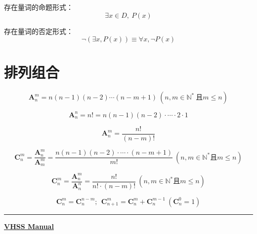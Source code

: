 \documentclass[a5paper]{article}
\begin{document}

存在量词的命题形式：
\begin{equation*}
    \exists{}x \in D,~P(x)
\end{equation*}

存在量词的否定形式：
\begin{equation*}
    \neg(\exists x,P(x)) \equiv \forall{}x, \neg P(x)
\end{equation*}


\section{{\large \textbf{排列组合}}}

\begin{equation*}
    \textbf{A}_{n}^{m} = n(n-1)(n-2)\cdots{}(n-m+1)~(n, m \in \mathbb{N}^{*}~\text{且}m \le n)
\end{equation*}

\begin{equation*}
    \textbf{A}_{n}^{n} = n! = n(n-1)(n-2) \cdot \cdots{} \cdot 2 \cdot 1
\end{equation*}

\begin{equation*}
    \textbf{A}_n^{m} = \frac{n!}{(n-m)!}
\end{equation*}

\begin{equation*}
    \textbf{C}_{n}^m = \frac{\textbf{A}_n^{m}}{\textbf{A}_m^{m}} = \frac{n(n-1)(n-2) \cdot \cdots{} \cdot (n-m+1)}{m!}~(n,m \in \mathbb{N}^* \text{且} m \le n)
\end{equation*}

\begin{equation*}
    \textbf{C}_{n}^m = \frac{\textbf{A}_n^{m}}{\textbf{A}_n^{n}} = \frac{n!}{n! \cdot (n-m)!}~(n,m \in \mathbb{N}^* \text{且} m \le n)
\end{equation*}

\begin{equation*}
    \textbf{C}_n^{m} = \textbf{C}_{n}^{n-m};~~\textbf{C}_{n+1}^{m} = \textbf{C}_n^{m} + \textbf{C}_n^{m-1}~(\textbf{C}_n^{0} = 1)
\end{equation*}

\vspace{5pt}
\hrule height 1pt
\begin{center}
    \textbf{\href{https://github.com/VHS-Survival-Manual/}{VHSS Manual}}
\end{center}
\end{document}
